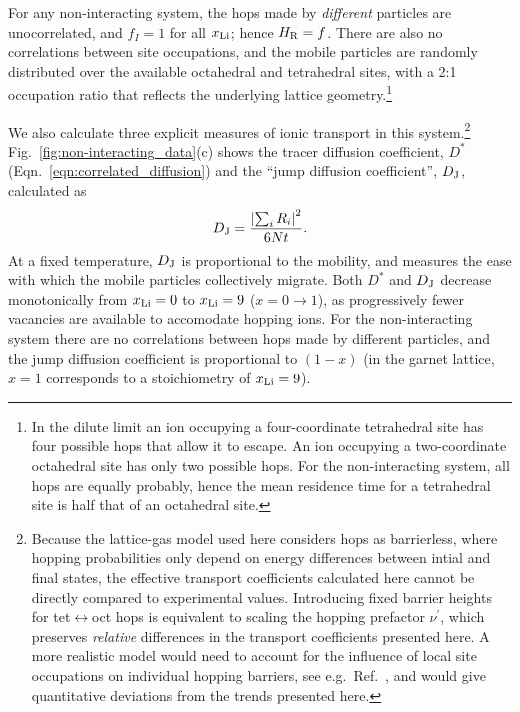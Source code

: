 \documentclass[aps,prb,twocolumn,superscriptaddress,reprint]{revtex4-1}
\newcommand{\xLi}{x_\m{Li}}
\begin{document}
For any non-interacting system, the hops made by \emph{different} particles are unocorrelated, and $f_I=1$ for all $\xLi$; hence $H_{\mathrm{R}}=f$. 
There are also no correlations between site occupations, and the mobile particles are randomly distributed over the available octahedral and tetrahedral sites, with a 2:1 occupation ratio that reflects the underlying lattice geometry.\footnote{In the dilute limit an ion occupying a four-coordinate tetrahedral site has four possible hops that allow it to escape. An ion occupying a two-coordinate octahedral site has only two possible hops. For the non-interacting system, all hops are equally probably, hence the mean residence time for a tetrahedral site is half that of an octahedral site.}

We also calculate three explicit measures of ionic transport in this system.\footnote{Because the lattice-gas model used here considers hops as barrierless, where hopping probabilities only depend on  energy differences between intial and final states, the effective transport coefficients calculated here cannot be directly compared to experimental values. 
Introducing fixed barrier heights for tet$\leftrightarrow$oct hops is equivalent to scaling the hopping prefactor $\nu^\prime$, which preserves \emph{relative} differences in the transport coefficients presented here. 
A more realistic model would need to account for the influence of local site occupations on individual hopping barriers, see e.g.\ Ref.~, and would give quantitative deviations from the trends presented here.} Fig.~\ref{fig:non-interacting_data}(c) shows the tracer diffusion coefficient, $D^*$ (Eqn.~\ref{eqn:correlated_diffusion}) and the ``jump diffusion coefficient'', $D_{\mathrm{J}}$,\cite{VanDerVenEtAl_AccChemRes2013} calculated as
\begin{equation}
  D_{\mathrm{J}}=\frac{\left|\sum_iR_i\right|^2}{6Nt}.
\end{equation}
At a fixed temperature, $D_{\mathrm{J}}$ is proportional to the mobility, and measures the ease with which the mobile particles collectively migrate. 
Both $D^*$ and $D_{\mathrm{J}}$ decrease monotonically from $\xLi=0$ to $\xLi=9$ ($x=0\to1$), as progressively fewer vacancies are available to accomodate hopping ions. 
For the non-interacting system there are no correlations between hops made by different particles, and the jump diffusion coefficient is proportional to $(1-x)$ (in the garnet lattice, $x=1$ corresponds to a stoichiometry of $\xLi=9$).\cite{Kutner_PhysLett1981,VanDerVenEtAl_AccChemRes2013}
\end{document}
